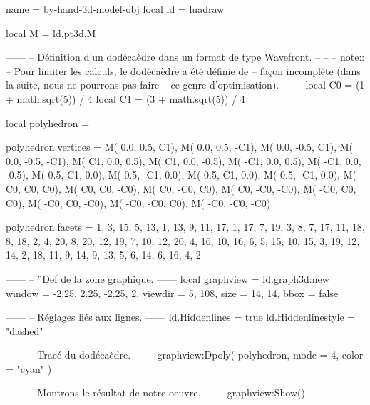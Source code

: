 \documentclass[border = 3pt]{standalone}
\begin{document}
\begin{luadraw*}{name = by-hand-3d-model-obj}
local ld = luadraw

local M = ld.pt3d.M

------
-- Définition d'un dodécaèdre dans un format de type Wavefront.
--
--
-- note::
--     Pour limiter les calculs, le dodécaèdre a été définie de
--     façon incomplète (dans la suite, nous ne pourrons pas faire
--     ce genre d'optimisation).
------
local C0 = (1 + math.sqrt(5)) / 4
local C1 = (3 + math.sqrt(5)) / 4

local polyhedron = {}

polyhedron.vertices = {
  M( 0.0,  0.5,   C1),
  M( 0.0,  0.5,  -C1),
  M( 0.0, -0.5,   C1),
  M( 0.0, -0.5,  -C1),
  M(  C1,  0.0,  0.5),
  M(  C1,  0.0, -0.5),
  M( -C1,  0.0,  0.5),
  M( -C1,  0.0, -0.5),
  M( 0.5,   C1,  0.0),
  M( 0.5,  -C1,  0.0),
  M(-0.5,   C1,  0.0),
  M(-0.5,  -C1,  0.0),
  M(  C0,   C0,   C0),
  M(  C0,   C0,  -C0),
  M(  C0,  -C0,   C0),
  M(  C0,  -C0,  -C0),
  M( -C0,   C0,   C0),
  M( -C0,   C0,  -C0),
  M( -C0,  -C0,   C0),
  M( -C0,  -C0,  -C0)
}

polyhedron.facets = {
  {  1,  3, 15,  5, 13},
  {  1, 13,  9, 11, 17},
  {  1, 17,  7, 19,  3},
  {  8,  7, 17, 11, 18},
  {  8, 18,  2,  4, 20},
  {  8, 20, 12, 19,  7},
  { 10, 12, 20,  4, 16},
  { 10, 16,  6,  5, 15},
  { 10, 15,  3, 19, 12},
  { 14,  2, 18, 11,  9},
  { 14,  9, 13,  5,  6},
  { 14,  6, 16,  4,  2}
}

------
-- ¨Def de la zone graphique.
------
local graphview = ld.graph3d:new{
  window  = {-2.25, 2.25, -2.25, 2},
  viewdir = {5, 108},
  size    = {14, 14},
  bbox    = false
}

------
-- Réglages liés aux lignes.
------
ld.Hiddenlines     = true
ld.Hiddenlinestyle = "dashed"

------
-- Tracé du dodécaèdre.
------
graphview:Dpoly(
  polyhedron,
  {
    mode  = 4,
    color = "cyan"
  }
)

------
-- Montrons le résultat de notre oeuvre.
------
graphview:Show()
\end{luadraw*}
\end{document}
